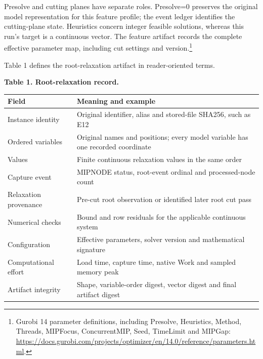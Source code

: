 \documentclass[
  british,
  10pt,
]{article}
\newcounter{none} %
\begin{document}
Presolve and cutting planes have separate roles. Presolve=0 preserves
the original model representation for this feature profile; the event
ledger identifies the cutting-plane state. Heuristics concern integer
feasible solutions, whereas this run's target is a continuous vector.
The feature artifact records the complete effective parameter map,
including cut settings and version.\footnote{Gurobi 14 parameter
  definitions, including Presolve, Heuristics, Method, Threads,
  MIPFocus, ConcurrentMIP, Seed, TimeLimit and MIPGap:
  \url{https://docs.gurobi.com/projects/optimizer/en/14.0/reference/parameters.html}.}

Table 1 defines the root-relaxation artifact in reader-oriented terms.


\textbf{Table 1. Root-relaxation record.}

{\def\LTcaptype{none} %
\begin{longtable}[]{@{}
  >{\raggedright\arraybackslash}p{}
  >{\raggedright\arraybackslash}p{}@{}}
\toprule\noalign{}
\begin{minipage}[b]{\linewidth}\raggedright
Field
\end{minipage} & \begin{minipage}[b]{\linewidth}\raggedright
Meaning and example
\end{minipage} \\
\midrule\noalign{}
\endhead
\bottomrule\noalign{}
\endlastfoot
Instance identity & Original identifier, alias and stored-file SHA256,
such as E12 \\
Ordered variables & Original names and positions; every model variable
has one recorded coordinate \\
Values & Finite continuous relaxation values in the same order \\
Capture event & MIPNODE status, root-event ordinal and processed-node
count \\
Relaxation provenance & Pre-cut root observation or identified later
root cut pass \\
Numerical checks & Bound and row residuals for the applicable continuous
system \\
Configuration & Effective parameters, solver version and mathematical
signature \\
Computational effort & Load time, capture time, native Work and sampled
memory peak \\
Artifact integrity & Shape, variable-order digest, vector digest and
final artifact digest \\
\end{longtable}
}
\end{document}
